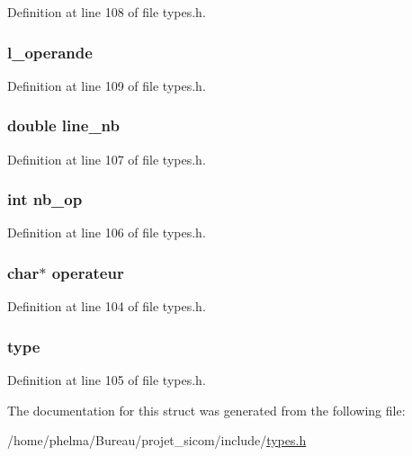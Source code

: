 Definition at line 108 of file types.\-h.

\hypertarget{struct__data___acdac487d99d10dba873a0f07707b220f}{
\subsubsection[{l\-\_\-operande}]{ l\-\_\-operande}}\label{struct__data___acdac487d99d10dba873a0f07707b220f}


Definition at line 109 of file types.\-h.

\hypertarget{struct__data___a808a37180ef5a21555b2f0f68cf73cb6}{
\subsubsection[{line\-\_\-nb}]{\setlength{\rightskip}{0pt plus 5cm}double line\-\_\-nb}}\label{struct__data___a808a37180ef5a21555b2f0f68cf73cb6}


Definition at line 107 of file types.\-h.

\hypertarget{struct__data___a88a29c0db6a919d126d1c94d573dd711}{
\subsubsection[{nb\-\_\-op}]{\setlength{\rightskip}{0pt plus 5cm}int nb\-\_\-op}}\label{struct__data___a88a29c0db6a919d126d1c94d573dd711}


Definition at line 106 of file types.\-h.

\hypertarget{struct__data___adc2a267b945f31e8e0dad4b528128cab}{
\subsubsection[{operateur}]{\setlength{\rightskip}{0pt plus 5cm}char$\ast$ operateur}}\label{struct__data___adc2a267b945f31e8e0dad4b528128cab}


Definition at line 104 of file types.\-h.

\hypertarget{struct__data___a610c78eb1986b43eaacecfddf32b24d2}{
\subsubsection[{type}]{ type}}\label{struct__data___a610c78eb1986b43eaacecfddf32b24d2}


Definition at line 105 of file types.\-h.



The documentation for this struct was generated from the following file\-:\begin{DoxyCompactItemize}
\item 
/home/phelma/\-Bureau/projet\-\_\-sicom/include/\hyperlink{types_8h}{types.\-h}\end{DoxyCompactItemize}
